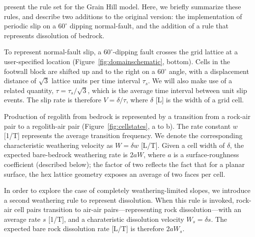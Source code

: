 \citet{tucker2018lattice} present the rule set for the Grain Hill model. Here, we briefly summarize these rules, and describe two additions to the original version: the implementation of periodic slip on a $60^\circ$ dipping normal-fault, and the addition of a rule that represents dissolution of bedrock.

To represent normal-fault slip, a $60^\circ$-dipping fault crosses the grid lattice at a user-specified location (Figure~\ref{fig:domainschematic}, bottom). Cells in the footwall block are shifted up and to the right on a 60$^\circ$ angle, with a displacement distance of $\sqrt{3}$ lattice units per time interval $\tau_s$. We will also make use of a related quantity, $\tau= \tau_s / \sqrt{3}$, which is the average time interval between unit slip events. The slip rate is therefore $V = \delta / \tau$, where $\delta$ [L] is the width of a grid cell.

Production of regolith from bedrock is represented by a transition from a rock-air pair to a regolith-air pair (Figure~\ref{fig:cellstates}, a to b). The rate constant $w$ [1/T] represents the average transition frequency. We denote the corresponding characteristic weathering velocity as $W=\delta w$ [L/T]. Given a cell width of $\delta$, the expected bare-bedrock weathering rate is $2a W$, where $a$ is a surface-roughness coefficient (described below); the factor of two reflects the fact that for a planar surface, the hex lattice geometry exposes an average of two faces per cell.

In order to explore the case of completely weathering-limited slopes, we introduce a second weathering rule to represent dissolution. When this rule is invoked, rock-air cell pairs transition to air-air pairs---representing rock dissolution---with an average rate $s$ [1/T], and a charateristic dissolution velocity $W_s = \delta s$. The expected bare rock dissolution rate [L/T] is therefore $2 a W_s$.

